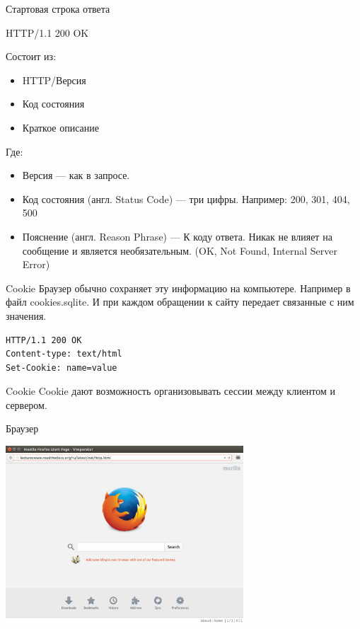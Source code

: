 \begin{frame}{Стартовая строка ответа}

    HTTP/1.1 200 OK

    Состоит из:
    \begin{itemize}
        \item HTTP/Версия
        \item Код состояния
        \item Краткое описание
    \end{itemize}

    Где:

    \begin{itemize}
        \item Версия — как в запросе.
        \item Код состояния (англ. Status Code) — три цифры.
            \newline Например: 200, 301, 404, 500
        \item Пояснение (англ. Reason Phrase) — К коду ответа. Никак не влияет
            на сообщение и является необязательным. (OK, Not Found, Internal Server Error)
    \end{itemize}

\end{frame}

\begin{frame}[fragile]{Cookie}
    Браузер обычно сохраняет эту информацию на компьютере.\newline
    Например в файл cookies.sqlite. \newline
    И при каждом обращении к сайту передает связанные с ним значения.
    \begin{Verbatim}[fontsize=\small]
HTTP/1.1 200 OK
Content-type: text/html
Set-Cookie: name=value
    \end{Verbatim}
\end{frame}

\begin{frame}{Cookie}
    Cookie дают возможность организовывать сессии между клиентом и сервером.
\end{frame}

\begin{frame}{Браузер}
    \begin{center}
        \includegraphics[width=3.5in]{media/http.example.mozzila.png}
    \end{center}
\end{frame}

